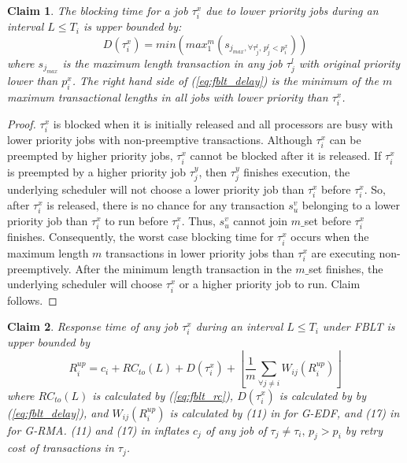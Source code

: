 \documentclass[12pt,english]{report}
\newtheorem{clm}{Claim}
\newtheorem{proof}{Proof}
\begin{document}
\begin{clm}

The blocking time for a job $\tau_{i}^{x}$ due to lower priority
jobs during an interval $L\le T_{i}$ is upper bounded by: 
\begin{equation}
D(\tau_{i}^{x})=min\left(max_{1}^{m}(s_{j_{max},\forall\tau_{j}^{l},\, p_{j}^{l}<p_{i}^{x}})\right)\label{eq:fblt_delay}
\end{equation}
where $s_{j_{max}}$ is the maximum length transaction in any job
$\tau_{j}^{l}$ with original priority lower than $p_{i}^{x}$. The
right hand side of (\ref{eq:fblt_delay}) is the minimum of the $m$
maximum transactional lengths in all jobs with lower priority than
$\tau_{i}^{x}$.

\end{clm}

\begin{proof}

$\tau_{i}^{x}$ is blocked when it is initially released and all processors
are busy with lower priority jobs with non-preemptive transactions.
Although $\tau_{i}^{x}$ can be preempted by higher priority jobs,
$\tau_{i}^{x}$ cannot be blocked after it is released. If $\tau_{i}^{x}$
is preempted by a higher priority job $\tau_{j}^{y}$, then $\tau_{j}^{y}$
finishes execution, the underlying scheduler will not choose a lower
priority job than $\tau_{i}^{x}$ before $\tau_{i}^{x}$. So, after
$\tau_{i}^{x}$ is released, there is no chance for any transaction
$s_{u}^{v}$ belonging to a lower priority job than $\tau_{i}^{x}$
to run before $\tau_{i}^{x}$. Thus, $s_{u}^{v}$ cannot join $m\_$set
before $\tau_{i}^{x}$ finishes. Consequently, the worst case blocking
time for $\tau_{i}^{x}$ occurs when the maximum length $m$ transactions
in lower priority jobs than $\tau_{i}^{x}$ are executing non-preemptively.
After the minimum length transaction in the $m\_$set finishes, the
underlying scheduler will choose $\tau_{i}^{x}$ or a higher priority
job to run. Claim follows.

\end{proof}

\begin{clm}

Response time of any job $\tau_{i}^{x}$ during an interval $L\le T_{i}$
under FBLT is upper bounded by 
\begin{equation}
R_{i}^{up}=c_{i}+RC_{to}(L)+D(\tau_{i}^{x})+\left\lfloor \frac{1}{m}\sum_{\forall j\ne i}W_{ij}(R_{i}^{up})\right\rfloor \label{eq:fblt_res_time}
\end{equation}
where $RC_{to}(L)$ is calculated by (\ref{eq:fblt_rc}), $D(\tau_{i}^{x})$
is calculated by by (\ref{eq:fblt_delay}), and $W_{ij}(R_{i}^{up})$
is calculated by (11) in \cite{stmconcurrencycontrol:emsoft11} for
G-EDF, and (17) in \cite{stmconcurrencycontrol:emsoft11} for G-RMA.
(11) and (17) in \cite{stmconcurrencycontrol:emsoft11} inflates $c_{j}$
of any job of $\tau_{j}\ne\tau_{i},\, p_{j}>p_{i}$ by retry cost
of transactions in $\tau_{j}$.

\end{clm}
\end{document}
